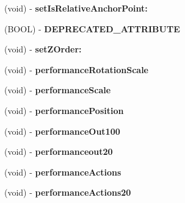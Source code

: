 \begin{DoxyCompactItemize}
\item 
\hypertarget{class_c_c_node_a2aed7b5ec0d47d3f4130ff6377abe753}{(void) -\/ {\bfseries set\-Is\-Relative\-Anchor\-Point\-:}}\label{class_c_c_node_a2aed7b5ec0d47d3f4130ff6377abe753}

\item 
\hypertarget{class_c_c_node_a5d2579e2aa773e36cad111809d661b96}{(B\-O\-O\-L) -\/ {\bfseries D\-E\-P\-R\-E\-C\-A\-T\-E\-D\-\_\-\-A\-T\-T\-R\-I\-B\-U\-T\-E}}\label{class_c_c_node_a5d2579e2aa773e36cad111809d661b96}

\item 
\hypertarget{class_c_c_node_a9b162a6a43e20dbb96b96f3082c6133e}{(void) -\/ {\bfseries set\-Z\-Order\-:}}\label{class_c_c_node_a9b162a6a43e20dbb96b96f3082c6133e}

\item 
\hypertarget{class_c_c_node_a2357723b9403456a67b90acb5ed010f6}{(void) -\/ {\bfseries performance\-Rotation\-Scale}}\label{class_c_c_node_a2357723b9403456a67b90acb5ed010f6}

\item 
\hypertarget{class_c_c_node_acd8824ae392cc45f4e4633d234831d57}{(void) -\/ {\bfseries performance\-Scale}}\label{class_c_c_node_acd8824ae392cc45f4e4633d234831d57}

\item 
\hypertarget{class_c_c_node_ae30c74ecebca8dce48aefc0fb2c868bb}{(void) -\/ {\bfseries performance\-Position}}\label{class_c_c_node_ae30c74ecebca8dce48aefc0fb2c868bb}

\item 
\hypertarget{class_c_c_node_a125a4fa69b04a69ed3d99761e3a0de5b}{(void) -\/ {\bfseries performance\-Out100}}\label{class_c_c_node_a125a4fa69b04a69ed3d99761e3a0de5b}

\item 
\hypertarget{class_c_c_node_a96b1cfe213e36637b682b1b695cb0569}{(void) -\/ {\bfseries performanceout20}}\label{class_c_c_node_a96b1cfe213e36637b682b1b695cb0569}

\item 
\hypertarget{class_c_c_node_a0994cbfcfef78ef6c060b0af7d666c42}{(void) -\/ {\bfseries performance\-Actions}}\label{class_c_c_node_a0994cbfcfef78ef6c060b0af7d666c42}

\item 
\hypertarget{class_c_c_node_a5e1e437628e1670065ee965d1a06d841}{(void) -\/ {\bfseries performance\-Actions20}}\label{class_c_c_node_a5e1e437628e1670065ee965d1a06d841}

\end{DoxyCompactItemize}
